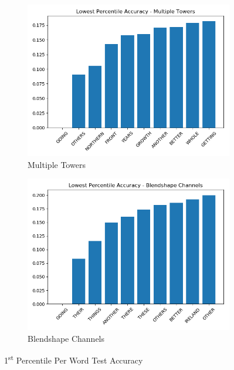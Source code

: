 \begin{figure}[h!]
    \centering
    \begin{subfigure}[b]{0.49\textwidth}
        \includegraphics[width=\textwidth]{figures/classification/blendshape_multi_tower_percentile_class_acc.png}
        \caption{Multiple Towers}\label{fig:multiple_towers_percentile_word_acc}
    \end{subfigure}
    \begin{subfigure}[b]{0.49\textwidth}
        \includegraphics[width=\textwidth]{figures/classification/blendshape_channel_percentile_class_acc.png}
        \caption{Blendshape Channels}\label{fig:channels_percentile_word_acc}
    \end{subfigure}
    \caption{1\textsuperscript{st} Percentile Per Word Test Accuracy}\label{fig:both_models_percentile_word_acc}
\end{figure}

